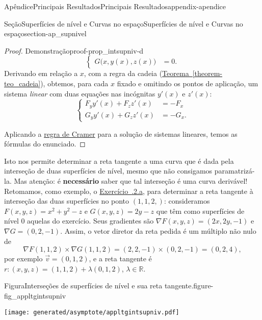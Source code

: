 \documentclass[oneside,10pt,]{book}
\newcommand{\xreffont}{\relax}
\newcommand{\terminology}[1]{\textbf{#1}}
\numberwithin{equation}{section}
\newcommand{\R}{\mathbb R}
\begin{document}
\begin{appendixptx}{Apêndice}{Principais Resultados}{}{Principais Resultados}{}{}{appendix-apendice}
\begin{sectionptx}{Seção}{Superfícies de nível e Curvas no espaço}{}{Superfícies de nível e Curvas no espaço}{}{}{section-ap_supnivel}
\begin{proof}{Demonstração}{}{proof-prop_intsupniv-d}
\begin{equation*}
\begin{cases}
G\big(x,y(x),z(x)\big)&=0.
\end{cases}
\end{equation*}
Derivando em relação a \(x\), com a regra da cadeia (\hyperref[theorem-teo_cadeia]{Teorema~{\xreffont\ref{theorem-teo_cadeia}}}), obtemos, para cada \(x\) fixado e omitindo os pontos de aplicação, um sistema \emph{linear} com duas equações nas incógnitas \(y'(x)\) e \(z'(x)\):%
\begin{equation*}
\begin{cases}
F_yy'(x)+F_zz'(x)&=-F_x\\
G_yy'(x)+G_zz'(x)&=-G_x.
\end{cases}
\end{equation*}
%
\par
Aplicando a \href{https://en.wikipedia.org/wiki/Cramer\%27s_rule\#Explicit_formulas_for_small_systems}{regra de Cramer}\footnotemark{} para a solução de sistemas lineares, temos as fórmulas do enunciado.%
\end{proof}
%
Isto nos permite determinar a reta tangente a uma curva que é dada pela interseção de duas superfícies de nível, mesmo que não consigamos paramatrizá-la. Mas atenção: é \terminology{necessário} saber que tal interseção é uma curva derivável! Retomamos, como exemplo, o \hyperlink{exercise-curvasR3-2a}{Exercício~{\xreffont 1.8.2.a}}, para determinar a reta tangente à interseção das duas superfícies no ponto \((1,1,2,)\): consideramos \(F(x,y,z)=x^2+y^2-z\) e \(G(x,y,z)=2y-z\) que têm como superfícies de nível \(0\) aquelas do exercício. Seus gradientes são \(\nabla F(x,y,z)=(2x,2y,-1)\) e\(\nabla
G=(0,2,-1)\). Assim, o vetor diretor da reta pedida é um múltiplo não nulo de%
\begin{equation*}
\nabla F(1,1,2)\times \nabla
G(1,1,2)=(2,2,-1)\times(0,2,-1)=(0,2,4),
\end{equation*}
por exemplo \(\vec{v}=(0,1,2)\), e a reta tangente é \(r\colon
(x,y,z)=(1,1,2)+\lambda(0,1,2)\), \(\lambda\in\R\). \begin{figureptx}{Figura}{Interseções de superfícies de nível e sua reta tangente.}{figure-fig_appltgintsupniv}{}%
\begin{image}{0.25}{0.5}{0.25}{}%
\texttt{[image: generated/asymptote/appltgintsupniv.pdf]}
\end{image}%
\tcblower
\end{figureptx}%
%
\par

\end{sectionptx}
\end{appendixptx}
\end{document}
